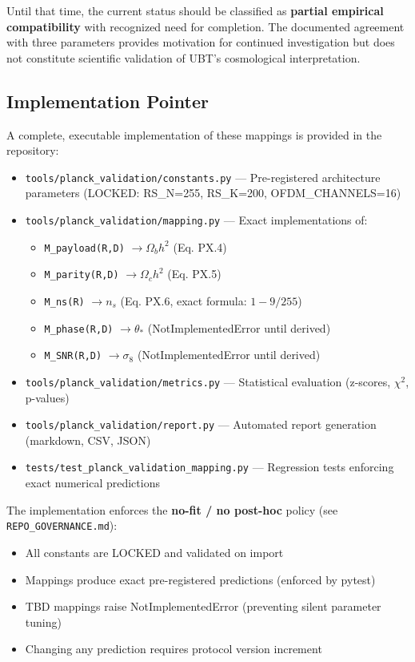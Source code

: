 Until that time, the current status should be classified as \textbf{partial empirical compatibility} with recognized need for completion. The documented agreement with three parameters provides motivation for continued investigation but does not constitute scientific validation of UBT's cosmological interpretation.

\subsection{Implementation Pointer}

A complete, executable implementation of these mappings is provided in the repository:

\begin{itemize}
\item \texttt{tools/planck\_validation/constants.py} --- Pre-registered architecture parameters (LOCKED: RS\_N=255, RS\_K=200, OFDM\_CHANNELS=16)
\item \texttt{tools/planck\_validation/mapping.py} --- Exact implementations of:
\begin{itemize}
    \item \texttt{M\_payload(R,D)} $\to \Omega_b h^2$ (Eq. PX.4)
    \item \texttt{M\_parity(R,D)} $\to \Omega_c h^2$ (Eq. PX.5)
    \item \texttt{M\_ns(R)} $\to n_s$ (Eq. PX.6, exact formula: $1 - 9/255$)
    \item \texttt{M\_phase(R,D)} $\to \theta_*$ (NotImplementedError until derived)
    \item \texttt{M\_SNR(R,D)} $\to \sigma_8$ (NotImplementedError until derived)
\end{itemize}
\item \texttt{tools/planck\_validation/metrics.py} --- Statistical evaluation (z-scores, $\chi^2$, p-values)
\item \texttt{tools/planck\_validation/report.py} --- Automated report generation (markdown, CSV, JSON)
\item \texttt{tests/test\_planck\_validation\_mapping.py} --- Regression tests enforcing exact numerical predictions
\end{itemize}

The implementation enforces the \textbf{no-fit / no post-hoc} policy (see \texttt{REPO\_GOVERNANCE.md}):
\begin{itemize}
\item All constants are LOCKED and validated on import
\item Mappings produce exact pre-registered predictions (enforced by pytest)
\item TBD mappings raise NotImplementedError (preventing silent parameter tuning)
\item Changing any prediction requires protocol version increment
\end{itemize}

